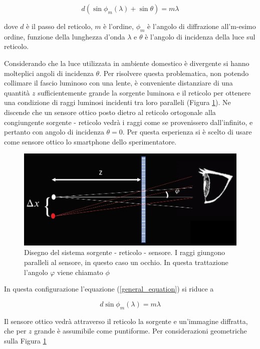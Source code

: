 \documentclass{article}
\begin{document}
\begin{equation}
    d(\sin\phi _m(\lambda)+\sin\theta) = m \lambda
    \label{general_equation}
\end{equation}

dove $d$ è il passo del reticolo, $m$ è l'ordine, $\phi_m$ è l'angolo di diffrazione all'm-esimo ordine, funzione della lunghezza d'onda $\lambda$ e $\theta$ è l'angolo di incidenza della luce sul reticolo.

\vspace{3mm}

Considerando che la luce utilizzata in ambiente domestico è divergente si hanno molteplici angoli di incidenza $\theta$. Per risolvere questa problematica, non potendo collimare il fascio luminoso con una lente, è conveniente distanziare di una quantità $z$ sufficientemente grande la sorgente luminosa e il reticolo per ottenere una condizione di raggi luminosi incidenti tra loro paralleli (Figura \ref{Schema_Diffrazione}). Ne discende che un sensore ottico posto dietro al reticolo ortogonale alla congiungente sorgente - reticolo vedrà i raggi come se provenissero dall'infinito, e pertanto con angolo di incidenza $\theta = 0$. Per questa esperienza si è scelto di usare come sensore ottico lo smartphone dello sperimentatore.

\begin{figure}[h]
    \centering
    \includegraphics[width=0.55\linewidth]{Schema_Diffrazione.JPG}
    \caption{Disegno del sistema sorgente - reticolo - sensore. I raggi giungono paralleli al sensore, in questo caso un occhio. In questa trattazione l'angolo $\varphi$ viene chiamato $\phi$}
    \label{Schema_Diffrazione}
\end{figure}

In questa configurazione l'equazione (\ref{general_equation}) si riduce a 

\begin{equation}
    d \sin\phi_m(\lambda)=m\lambda
    \label{2nd_equation}
\end{equation}

Il sensore ottico vedrà attraverso il reticolo la sorgente e un'immagine diffratta, che per $z$ grande è assumibile come puntiforme.
Per considerazioni geometriche sulla Figura \ref{Schema_Diffrazione} 
\end{document}
